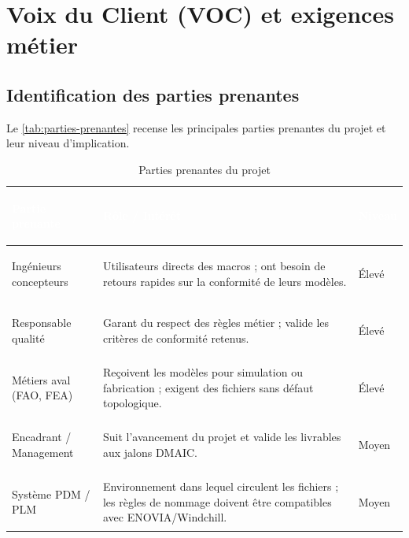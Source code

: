 \section{Voix du Client (VOC) et exigences métier}

\subsection{Identification des parties prenantes}

Le \autoref{tab:parties-prenantes} recense les principales parties prenantes du projet et leur niveau d'implication.

\begin{table}[H]
    \centering
    \caption{Parties prenantes du projet}%
    \label{tab:parties-prenantes}
    \begin{tabularx}{\textwidth}{|>{\bfseries\raggedright\arraybackslash}p{4cm}|X|>{\centering\arraybackslash}p{2.5cm}|}
        \hline
        \rowcolor{headerblue}
        \textcolor{white}{\textbf{Partie prenante}} & \centering\textcolor{white}{\textbf{Rôle / Intérêt}} & \textcolor{white}{\textbf{Niveau}}\tabularnewline
        \hline
        \rowcolor{rowlight}
        Ingénieurs concepteurs & Utilisateurs directs des macros ; ont besoin de retours rapides sur la conformité de leurs modèles. & Élevé \\
        \hline
        \rowcolor{rowwhite}
        Responsable qualité & Garant du respect des règles métier ; valide les critères de conformité retenus. & Élevé \\
        \hline
        \rowcolor{rowlight}
        Métiers aval (FAO, FEA) & Reçoivent les modèles pour simulation ou fabrication ; exigent des fichiers sans défaut topologique. & Élevé \\
        \hline
        \rowcolor{rowwhite}
        Encadrant / Management & Suit l'avancement du projet et valide les livrables aux jalons DMAIC\@. & Moyen \\
        \hline
        \rowcolor{rowlight}
        Système PDM / PLM & Environnement dans lequel circulent les fichiers ; les règles de nommage doivent être compatibles avec ENOVIA/Windchill. & Moyen \\
        \hline
    \end{tabularx}
\end{table}

